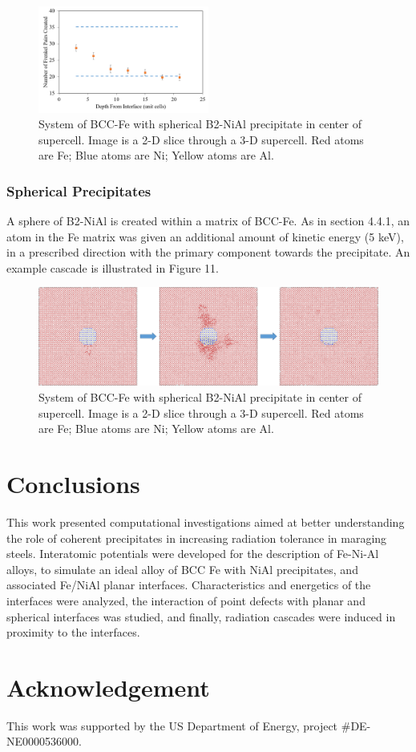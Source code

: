 \documentclass[review]{elsarticle}
\begin{document}
\begin{figure}[htp]
   \centering
   \includegraphics[width=0.5\textwidth]{rad_dam_prof.png} 
   \caption{System of BCC-Fe with spherical B2-NiAl precipitate in center of supercell.  Image is a 2-D slice through a 3-D supercell.  Red atoms are Fe; Blue atoms are Ni; Yellow atoms are Al.}
   \label{fig:example}
\end{figure}

\FloatBarrier
\subsubsection{Spherical Precipitates}
A sphere of B2-NiAl is created within a matrix of BCC-Fe.  As in section 4.4.1, an atom in the Fe matrix was given an additional amount of kinetic energy (5 keV), in a prescribed direction with the primary component towards the precipitate.  An example cascade is illustrated in Figure 11.  


\begin{figure}[htp]
   \centering
   \includegraphics[width=\textwidth]{rad_dam_sphere.png} 
   \caption{System of BCC-Fe with spherical B2-NiAl precipitate in center of supercell.  Image is a 2-D slice through a 3-D supercell.  Red atoms are Fe; Blue atoms are Ni; Yellow atoms are Al.}
   \label{fig:example}
\end{figure}



\FloatBarrier
\section{Conclusions}
This work presented computational investigations aimed at better understanding the role of coherent precipitates in increasing radiation tolerance in maraging steels.  Interatomic potentials were developed for the description of Fe-Ni-Al alloys, to simulate an ideal alloy of BCC Fe with NiAl precipitates, and associated Fe/NiAl planar interfaces.  Characteristics and energetics of the interfaces were analyzed, the interaction of point defects with planar and spherical interfaces was studied, and finally, radiation cascades were induced in proximity to the interfaces.

\section{Acknowledgement}
This work was supported by the US Department of Energy, project $\#$DE-NE0000536000.

\FloatBarrier


\end{document}
